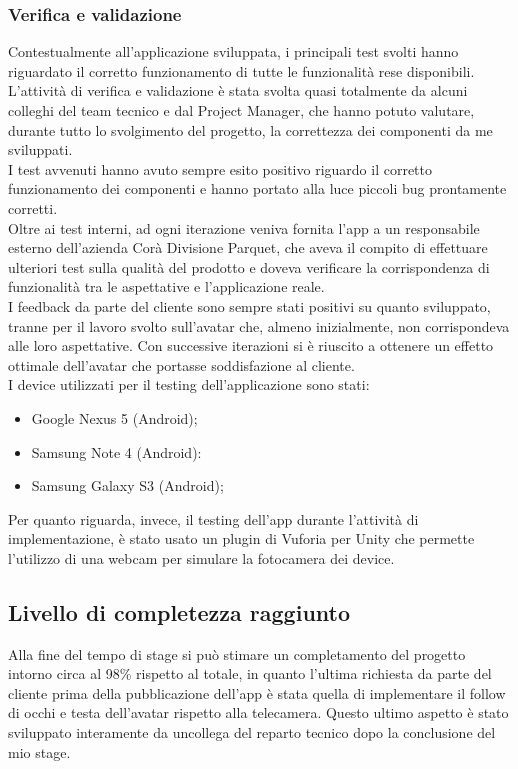 \subsubsection{Verifica e validazione}
Contestualmente all'applicazione sviluppata, i principali test svolti hanno riguardato il corretto funzionamento di tutte le funzionalit\`a rese disponibili. L'attivit\`a di verifica e validazione \`e stata svolta quasi totalmente da alcuni colleghi del team tecnico e dal Project Manager, che hanno potuto valutare, durante tutto lo svolgimento del progetto, la correttezza dei componenti da me sviluppati.\\
I test avvenuti hanno avuto sempre esito positivo riguardo il corretto funzionamento dei componenti e hanno portato alla luce piccoli bug prontamente corretti.\\
Oltre ai test interni, ad ogni iterazione veniva fornita l'app a un responsabile esterno dell'azienda Cor\`a Divisione Parquet, che aveva il compito di effettuare ulteriori test sulla qualit\`a del prodotto e doveva verificare la corrispondenza di funzionalit\`a tra le aspettative e l'applicazione reale.\\
I feedback da parte del cliente sono sempre stati positivi su quanto sviluppato, tranne per il lavoro svolto sull'avatar che, almeno inizialmente, non corrispondeva alle loro aspettative. Con successive iterazioni si \`e riuscito a ottenere un effetto ottimale dell'avatar che portasse soddisfazione al cliente.\\
I device utilizzati per il testing dell'applicazione sono stati:

\begin{itemize}
	\item Google Nexus 5 (Android);
	\item Samsung Note 4 (Android):
	\item Samsung Galaxy S3 (Android);
\end{itemize}

Per quanto riguarda, invece, il testing dell'app durante l'attivit\`a di implementazione, \`e stato usato un plugin di Vuforia per Unity che permette l'utilizzo di una webcam per simulare la fotocamera dei device.

\subsection{Livello di completezza raggiunto}
Alla fine del tempo di stage si pu\`o stimare un completamento del progetto intorno circa al 98\% rispetto al totale, in quanto l'ultima richiesta da parte del cliente prima della pubblicazione dell'app \`e stata quella di implementare il follow di occhi e testa dell'avatar rispetto alla telecamera. Questo ultimo aspetto \`e stato sviluppato interamente da uncollega del reparto tecnico dopo la conclusione del mio stage.
